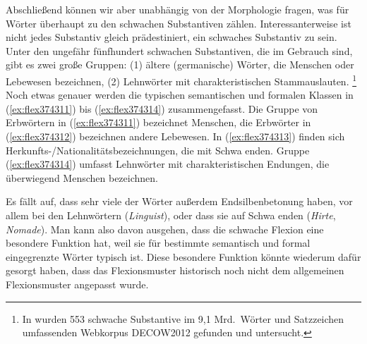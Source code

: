 Abschließend können wir aber unabhängig von der Morphologie fragen, was für Wörter überhaupt zu den schwachen Substantiven zählen.
Interessanterweise ist nicht jedes Substantiv gleich prädestiniert, ein schwaches Substantiv zu sein.
Unter den ungefähr fünfhundert schwachen Substantiven, die im Gebrauch sind, gibt es zwei große Gruppen:
(1) ältere (germanische) Wörter, die Menschen oder Lebewesen bezeichnen,
(2) Lehnwörter mit charakteristischen Stammauslauten.%
\footnote{In \citet{Schaefer2015b} wurden 553 schwache Substantive im 9,1 Mrd.\ Wörter und Satzzeichen umfassenden Webkorpus DECOW2012 gefunden und untersucht.}
Noch etwas genauer werden die typischen semantischen und formalen Klassen in (\ref{ex:flex374311}) bis (\ref{ex:flex374314}) zusammengefasst.
Die Gruppe von Erbwörtern in (\ref{ex:flex374311}) bezeichnet Menschen, die Erbwörter in (\ref{ex:flex374312}) bezeichnen andere Lebewesen.
In (\ref{ex:flex374313}) finden sich Herkunfts-\slash Nationalitätsbezeichnungen, die mit Schwa enden.
Gruppe (\ref{ex:flex374314}) umfasst Lehnwörter mit charakteristischen Endungen, die überwiegend Menschen bezeichnen.

\begin{exe}
\end{exe}

Es fällt auf, dass sehr viele der Wörter außerdem Endsilbenbetonung haben, vor allem bei den Lehnwörtern (\textit{Lingu\Akz ist}), oder dass sie auf Schwa enden (\textit{Hirte}, \textit{Nomade}).
Man kann also davon ausgehen, dass die schwache Flexion eine besondere Funktion hat, weil sie für bestimmte semantisch und formal eingegrenzte Wörter typisch ist.
Diese besondere Funktion könnte wiederum dafür gesorgt haben, dass das Flexionsmuster historisch noch nicht dem allgemeinen Flexionsmuster angepasst wurde.

\Stretch[1]

